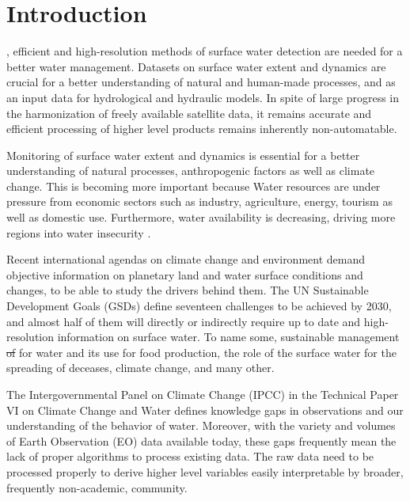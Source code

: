 \chapter{Introduction}

\label{intro}

, efficient and high-resolution methods of surface water detection are needed for a better water management. Datasets on surface water extent and dynamics are crucial for a better understanding of natural and human-made processes, and as an input data for hydrological and hydraulic models. In spite of large progress in the harmonization of freely available satellite data, it remains accurate and efficient processing of higher level products remains inherently non-automatable.

Monitoring of surface water extent and dynamics is essential for a better understanding of natural processes, anthropogenic factors as well as climate change. This is becoming more important because Water resources are under pressure from economic sectors such as industry, agriculture, energy, tourism as well as domestic use. Furthermore, water availability is decreasing,  driving more regions into water insecurity \citet{unfao2006watermonitoring, McDonald12042011}.

Recent international agendas on climate change and environment demand objective information on planetary land and water surface conditions and changes, to be able to study the drivers behind them. The UN Sustainable Development Goals (GSDs) \citet{un2015resolution} define seventeen challenges to be achieved by 2030, and almost half of them will directly or indirectly require up to date and high-resolution information on surface water. To name some, sustainable management \st{of} for water and its use for food production, the role of the surface water for the spreading of deceases, climate change, and many other. 

The Intergovernmental Panel on Climate Change (IPCC) in the Technical Paper VI on Climate Change and Water defines knowledge gaps in observations and our understanding of the behavior of water. Moreover, with the variety and volumes of Earth Observation (EO) data available today, these gaps frequently mean the lack of proper algorithms to process existing data. The raw data need to be processed properly to derive higher level variables easily interpretable by broader, frequently non-academic, community. 


